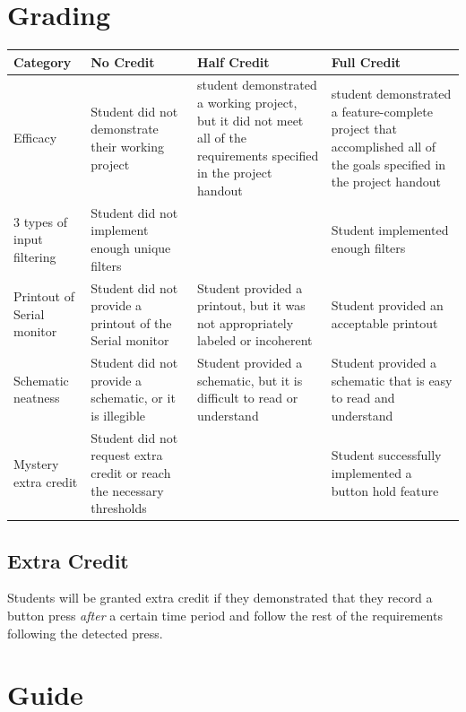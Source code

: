 \documentclass{article}
\begin{document}
\section*{Grading}
\begin{tabular}{ | p{1in} | p{1.75in} | p{1.75in} | p{1.75in} | }
    \hline
    \textbf{Category} & \textbf{No Credit} & \textbf{Half Credit} & \textbf{Full Credit} \\

    \hline
    Efficacy & 
    Student did not demonstrate their working project & 
    student demonstrated a working project, but it did not meet all of the requirements specified in the project handout & 
    student demonstrated a feature-complete project that accomplished all of the goals specified in the project handout \\
    \hline
    3 types of input filtering & 
    Student did not implement enough unique filters &
    &
    Student implemented enough filters \\
    \hline
    Printout of Serial monitor & 
    Student did not provide a printout of the Serial monitor &
    Student provided a printout, but it was not appropriately labeled or incoherent&
    Student provided an acceptable printout \\
    \hline
    Schematic neatness & 
    Student did not provide a schematic, or it is illegible &
    Student provided a schematic, but it is difficult to read or understand &
    Student provided a schematic that is easy to read and understand \\
    \hline
    Mystery extra credit &
    Student did not request extra credit or reach the necessary thresholds & 
    &
    Student successfully implemented a button hold feature \\

    \hline
\end{tabular}

    \subsection*{Extra Credit}
    Students will be granted extra credit if they demonstrated that they record a button press \emph{after} a certain time period and follow the rest of the requirements following the detected press.

\section*{Guide}
\end{document}
